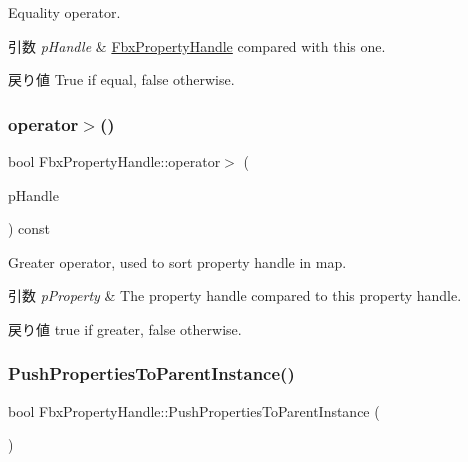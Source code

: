 Equality operator. 
\begin{DoxyParams}{引数}
{\em p\+Handle} & \hyperlink{class_fbx_property_handle}{Fbx\+Property\+Handle} compared with this one. \\
\hline
\end{DoxyParams}
\begin{DoxyReturn}{戻り値}
{\ttfamily True} if equal, {\ttfamily false} otherwise. 
\end{DoxyReturn}
\mbox{\label{class_fbx_property_handle_add1ef2cecd4a73e427d8d8713d776ccd}} 
\subsubsection{\texorpdfstring{operator$>$()}{operator>()}}
{\footnotesize\ttfamily bool Fbx\+Property\+Handle\+::operator$>$ (\begin{DoxyParamCaption}\item[{const \hyperlink{class_fbx_property_handle}{Fbx\+Property\+Handle} \&}]{p\+Handle }\end{DoxyParamCaption}) const}

Greater operator, used to sort property handle in map. 
\begin{DoxyParams}{引数}
{\em p\+Property} & The property handle compared to this property handle. \\
\hline
\end{DoxyParams}
\begin{DoxyReturn}{戻り値}
{\ttfamily true} if greater, {\ttfamily false} otherwise. 
\end{DoxyReturn}
\mbox{\label{class_fbx_property_handle_a94d8590ac684a0a0895e399396b79c52}} 
\subsubsection{\texorpdfstring{Push\+Properties\+To\+Parent\+Instance()}{PushPropertiesToParentInstance()}}
{\footnotesize\ttfamily bool Fbx\+Property\+Handle\+::\+Push\+Properties\+To\+Parent\+Instance (\begin{DoxyParamCaption}{ }\end{DoxyParamCaption})}

